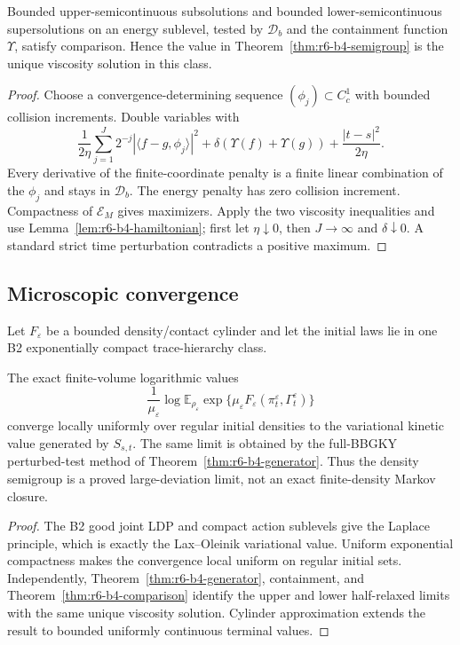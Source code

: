 \begin{theorem}
\label{thm:r6-b4-comparison}
Bounded upper-semicontinuous subsolutions and bounded lower-semicontinuous
supersolutions on an energy sublevel, tested by \(\mathscr D_b\) and the
containment function \(\Upsilon\), satisfy comparison.  Hence the value in
Theorem~\ref{thm:r6-b4-semigroup} is the unique viscosity solution in this
class.
\end{theorem}

\begin{proof}
Choose a convergence-determining sequence
\((\phi_j)\subset C_c^1\) with bounded collision increments.  Double variables
with
\[
\frac1{2\eta}\sum_{j=1}^J2^{-j}
|\langle f-g,\phi_j\rangle|^2
+\delta(\Upsilon(f)+\Upsilon(g))
+\frac{|t-s|^2}{2\eta}.
\]
Every derivative of the finite-coordinate penalty is a finite linear
combination of the \(\phi_j\) and stays in \(\mathscr D_b\).  The energy
penalty has zero collision increment.  Compactness of \(\mathcal E_M\) gives
maximizers.  Apply the two viscosity inequalities and use
Lemma~\ref{lem:r6-b4-hamiltonian}; first let \(\eta\downarrow0\), then
\(J\to\infty\) and \(\delta\downarrow0\).  A standard strict time
perturbation contradicts a positive maximum.
\end{proof}

\subsection{Microscopic convergence}

Let \(F_\varepsilon\) be a bounded density/contact cylinder and let the
initial laws lie in one B2 exponentially compact trace-hierarchy class.

\begin{theorem}
\label{thm:r6-b4-limit}
The exact finite-volume logarithmic values
\[
\frac1{\mu_\varepsilon}\log
\mathbb E_{\rho_\varepsilon}
\exp\{\mu_\varepsilon F_\varepsilon(\pi_t^\varepsilon,
\Gamma_t^\varepsilon)\}
\]
converge locally uniformly over regular initial densities to the variational
kinetic value generated by \(S_{s,t}\).  The same limit is obtained by the
full-BBGKY perturbed-test method of
Theorem~\ref{thm:r6-b4-generator}.  Thus the density semigroup is a proved
large-deviation limit, not an exact finite-density Markov closure.
\end{theorem}

\begin{proof}
The B2 good joint LDP and compact action sublevels give the Laplace principle,
which is exactly the Lax--Oleinik variational value.  Uniform exponential
compactness makes the convergence local uniform on regular initial sets.
Independently, Theorem~\ref{thm:r6-b4-generator}, containment, and
Theorem~\ref{thm:r6-b4-comparison} identify the upper and lower half-relaxed
limits with the same unique viscosity solution.  Cylinder approximation
extends the result to bounded uniformly continuous terminal values.
\end{proof}


